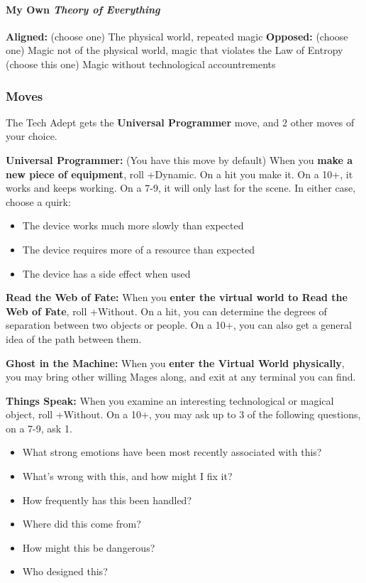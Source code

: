 \documentclass[
]{article}
\providecommand{\tightlist}{%
  \setlength{\itemsep}{0pt}\setlength{\parskip}{0pt}}
\begin{document}
\hypertarget{my-own-theory-of-everything}{%
\paragraph{\texorpdfstring{My Own \emph{Theory of
Everything}}{My Own Theory of Everything}}\label{my-own-theory-of-everything}}

\textbf{Aligned:} (choose one) The physical world, repeated magic
\textbf{Opposed:} (choose one) Magic not of the physical world, magic
that violates the Law of Entropy\\
(choose this one) Magic without technological accountrements

\hypertarget{moves-6}{%
\subsubsection{Moves}\label{moves-6}}

The Tech Adept gets the \textbf{Universal Programmer} move, and 2 other
moves of your choice.

\textbf{Universal Programmer:} (You have this move by default) When you
\textbf{make a new piece of equipment}, roll +Dynamic. On a hit you make
it. On a 10+, it works and keeps working. On a 7-9, it will only last
for the scene. In either case, choose a quirk:

\begin{itemize}
\tightlist
\item
  The device works much more slowly than expected
\item
  The device requires more of a resource than expected
\item
  The device has a side effect when used
\end{itemize}

\textbf{Read the Web of Fate:} When you \textbf{enter the virtual world
to Read the Web of Fate}, roll +Without. On a hit, you can determine the
degrees of separation between two objects or people. On a 10+, you can
also get a general idea of the path between them.

\textbf{Ghost in the Machine:} When you \textbf{enter the Virtual World
physically}, you may bring other willing Mages along, and exit at any
terminal you can find.

\textbf{Things Speak:} When you examine an interesting technological or
magical object, roll +Without. On a 10+, you may ask up to 3 of the
following questions, on a 7-9, ask 1.

\begin{itemize}
\tightlist
\item
  What strong emotions have been most recently associated with this?
\item
  What's wrong with this, and how might I fix it?
\item
  How frequently has this been handled?
\item
  Where did this come from?
\item
  How might this be dangerous?
\item
  Who designed this?
\end{itemize}
\end{document}
